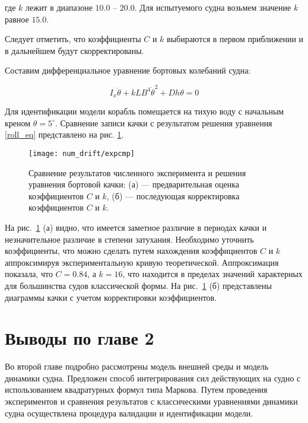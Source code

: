 где $k$ лежит в диапазоне $10.0$ -- $20.0$. Для испытуемого судна возьмем значение $k$ равное $15.0$.

Следует отметить, что коэффициенты $C$ и $k$ выбираются в первом приближении и в дальнейшем будут скорректированы.

Составим дифференциальное уравнение бортовых колебаний судна:

\begin{equation}
	I_x \ddot{\theta} + kLB^4\dot{\theta}^2 + Dh \theta = 0
	\label{roll_eq}
\end{equation}

Для идентификации модели корабль помещается на тихую воду с начальным креном $\theta=5^{\circ}$. Сравнение записи качки с результатом решения уравнения \eqref{roll_eq} представлено на рис. \ref{drift:expcmp}.

\begin{figure}
	\texttt{[image: num\_drift/expcmp]}
	\caption{Сравнение результатов численного эксперимента и решения уравнения бортовой качки: (а) --- предварительная оценка коэффициентов $C$ и $k$, (б) --- последующая корректировка коэффициентов $C$ и $k$.}
	\label{drift:expcmp}
\end{figure}

На рис.~\ref{drift:expcmp} (а) видно, что имеется заметное различие в периодах качки и незначительное различие в степени затухания. Необходимо уточнить коэффициенты, что можно сделать путем 
нахождения коэффициентов $C$ и $k$ аппроксимируя экспериментальную кривую теоретической.
Аппроксимация показала, что $C=0.84$, а $k=16$, что находится в пределах значений характерных для большинства судов классической формы. На рис.~\ref{drift:expcmp} (б) представлены 
диаграммы качки с учетом корректировки коэффициентов.

%



\section{Выводы по главе 2}

Во второй главе подробно рассмотрены модель внешней среды и модель динамики судна.
Предложен способ интегрирования сил действующих на судно с использованием квадратурных формул типа Маркова.
Путем проведения экспериментов и сравнения результатов с классическими уравнениями динамики судна осуществлена процедура валидации 
и идентификации модели.








